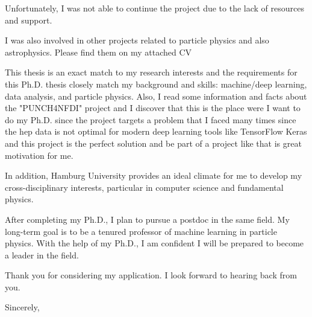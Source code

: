 \documentclass[localFont,11pt,compact]{yaac-another-awesome-cv}
\begin{document}
Unfortunately, I was not able to continue the project due to the lack of resources and support. 

I was also involved in other projects related to particle physics and also astrophysics. Please find them on my attached CV 

  


This thesis is an exact match to my research interests and the requirements for this Ph.D. thesis closely match my background and skills: machine/deep learning, data analysis, and particle physics.  
Also, I read some information and facts about the "PUNCH4NFDI" project and I discover that this is the place were I want to do my Ph.D. since the project targets a problem that I faced many times since the hep data is not optimal for modern deep learning tools like TensorFlow Keras and this project is the perfect solution and be part of a project like that is great motivation for me. 

In addition, Hamburg University provides an ideal climate for me to develop my cross-disciplinary interests, particular in computer science and fundamental physics. 

After completing my Ph.D., I plan to pursue a postdoc in the same field. My long-term goal is to be a tenured professor of machine learning in particle physics. With the help of my Ph.D., I am confident I will be prepared to become a leader in the field. 



Thank you for considering my application. I look forward to hearing back from you. 

  

Sincerely, 

 

 
\end{document}
